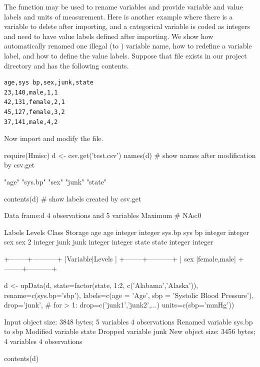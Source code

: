 The   function may be used to rename variables
and provide variable and value labels and units of measurement.
Here is another example where there is a  variable to
delete after importing, and a categorical variable is coded as
integers and need to have value labels defined after
importing.  We show how  automatically renamed one illegal
(to \R) variable name, how to redefine a variable label, and how to
define the value labels.  Suppose that file  exists in
our project directory and has the following contents.
{\small\begin{verbatim}
age,sys bp,sex,junk,state
23,140,male,1,1
42,131,female,2,1
45,127,female,3,2
37,141,male,4,2
\end{verbatim}}
Now import and modify the file.
\begin{Schunk}
\begin{Sinput}
require(Hmisc)
d <- csv.get('test.csv')
names(d)   # show names after modification by csv.get
\end{Sinput}
\begin{Soutput}
[1] "age"    "sys.bp" "sex"    "junk"   "state" 
\end{Soutput}
\begin{Sinput}
contents(d)  # show labels created by csv.get
\end{Sinput}
\begin{Soutput}

Data frame:d	4 observations and 5 variables    Maximum # NAs:0


       Labels Levels   Class Storage
age       age        integer integer
sys.bp sys bp        integer integer
sex       sex      2         integer
junk     junk        integer integer
state   state        integer integer

+--------+-----------+
|Variable|Levels     |
+--------+-----------+
|   sex  |female,male|
+--------+-----------+
\end{Soutput}
\begin{Sinput}
d <- upData(d,
            state=factor(state, 1:2, c('Alabama','Alaska')),
            rename=c(sys.bp='sbp'),
            labels=c(age = 'Age',
                     sbp = 'Systolic Blood Pressure'),
            drop='junk',   # for > 1: drop=c('junk1','junk2',...)
   units=c(sbp='mmHg'))
\end{Sinput}
\begin{Soutput}
Input object size:	 3848 bytes;	 5 variables	 4 observations
Renamed variable	 sys.bp 	to sbp 
Modified variable	state
Dropped variable	junk
New object size:	3456 bytes;	4 variables	4 observations
\end{Soutput}
\begin{Sinput}
contents(d)
\end{Sinput}
\begin{Soutput}


\end{Soutput}
\end{Schunk}
